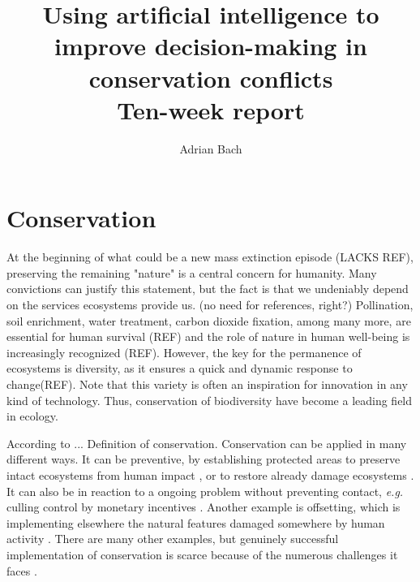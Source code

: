 \documentclass[12pt,a4paper]{article}
\author{Adrian Bach}
\title{Using artificial intelligence to improve decision-making in conservation conflicts \\\medskip Ten-week report}
\begin{document}
\maketitle

\tableofcontents

\newpage
\section{Conservation}

At the beginning of what could be a new mass extinction episode (LACKS REF), preserving the remaining "nature" is a central concern for humanity.
Many convictions can justify this statement, but the fact is that we undeniably depend on the services ecosystems provide us. (no need for references, right?)
Pollination, soil enrichment, water treatment, carbon dioxide fixation, among many more, are essential for human survival (REF) and the role of nature in human well-being is increasingly recognized (REF).
However, the key for the permanence of ecosystems is diversity, as it ensures a quick and dynamic response to change(REF).
Note that this variety is often an inspiration for innovation in any kind of technology.
Thus, conservation of biodiversity have become a leading field in ecology.
%
%

According to ... Definition of conservation.
Conservation can be applied in many different ways.
It can be preventive, by establishing protected areas to preserve intact ecosystems from human impact \citep{vanwilgen2011critical, bainbridge2017goose}, or to restore already damage ecosystems \citep{rumpff2011state}. 
It can also be in reaction to a ongoing problem without preventing contact, \textit{e.g.} culling control by monetary incentives \citep{mason2017changing, cusack2018time}.
Another example is offsetting, which is implementing elsewhere the natural features damaged somewhere by human activity \citep{gordon2011assessing}.
There are many other examples, but genuinely successful implementation of conservation is scarce because of the numerous challenges it faces \citep{keith2011uncertainty, vanwilgen2011critical}.
\end{document}
